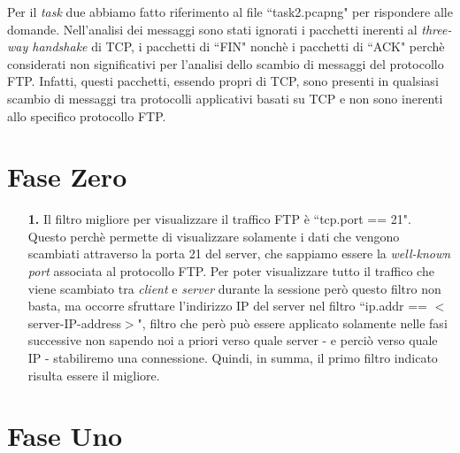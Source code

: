 \documentclass[a4paper, 12pt]{report}
\begin{document}
Per il \textit{task} due abbiamo fatto riferimento al file ``task2.pcapng" per rispondere alle domande. Nell'analisi dei messaggi sono stati ignorati i pacchetti inerenti al \textit{three-way handshake}
di TCP, i pacchetti di ``FIN" nonchè i pacchetti di ``ACK" perchè considerati non significativi per l'analisi dello scambio di messaggi del protocollo FTP. Infatti, questi pacchetti, essendo propri di TCP,
sono presenti in qualsiasi scambio di messaggi tra protocolli applicativi basati su TCP e non sono inerenti allo specifico protocollo FTP.

\section{Fase Zero}

\begin{enumerate}
    \item[\textbf{1.}] Il filtro migliore per visualizzare il traffico FTP è ``tcp.port == 21". Questo perchè permette di visualizzare
    solamente i dati che vengono scambiati attraverso la porta 21 del server, che sappiamo essere la \textit{well-known port}
    associata al protocollo FTP. Per poter visualizzare tutto il traffico che viene scambiato tra \textit{client} e \textit{server} durante
    la sessione però questo filtro non basta, ma occorre sfruttare l'indirizzo IP del server nel filtro ``ip.addr == $<$server-IP-address$>$",
    filtro che però può essere applicato solamente nelle fasi successive non sapendo noi a priori verso quale server - e perciò verso quale IP -
    stabiliremo una connessione. Quindi, in summa, il primo filtro indicato risulta essere il migliore.
\end{enumerate}

\section{Fase Uno}
\end{document}
